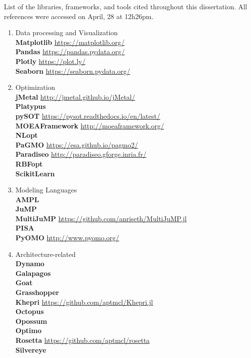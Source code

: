 List of the libraries, frameworks, and tools cited throughout this dissertation. All references were accessed on April, 28 at 12h26pm.
\begin{enumerate}[label=\Alph*]
\item Data processing and Visualization \\
\textbf{Matplotlib} \url{https://matplotlib.org/} \\
\textbf{Pandas} \url{https://pandas.pydata.org/} \\
\textbf{Plotly} \url{https://plot.ly/} \\
\textbf{Seaborn} \url{https://seaborn.pydata.org/}

\item Optimization \\
\textbf{jMetal} \url{http://jmetal.github.io/jMetal/} \\
\textbf{Platypus} \cite{platypus} \\
\textbf{pySOT} \url{https://pysot.readthedocs.io/en/latest/} \\
\textbf{MOEAFramework} \url{http://moeaframework.org/} \\
\textbf{NLopt} \cite{NLOPT} \\
\textbf{PaGMO} \url{https://esa.github.io/pagmo2/} \\
\textbf{Paradiseo} \url{http://paradiseo.gforge.inria.fr/} \\
\textbf{RBFopt} \cite{RBFOPT} \\ 
\textbf{ScikitLearn} \cite{scikit-learn} 

\item Modeling Languages  \\
\textbf{AMPL} \cite{AMPL} \\
\textbf{JuMP} \cite{DunningHuchetteLubin2017} \\
\textbf{MultiJuMP} \url{https://github.com/anriseth/MultiJuMP.jl} \\
\textbf{PISA} \cite{PISA2003} \\
\textbf{PyOMO} \url{http://www.pyomo.org/} \\

\item Architecture-related \\
\textbf{Dynamo} \cite{DYNAMOBIM} \\
\textbf{Galapagos} \cite{GALAPAGOS} \\
\textbf{Goat} \cite{GOAT} \\ 
\textbf{Grasshopper} \cite{GRASSHOPPER} \\ 
\textbf{Khepri} \url{https://github.com/aptmcl/Khepri.jl} \\
\textbf{Octopus} \cite{OCTOPUS} \\
\textbf{Opossum}  \cite{Wortmann2017Opossum} \\
\textbf{Optimo} \cite{OPTIMO} \\
\textbf{Rosetta} \url{https://github.com/aptmcl/rosetta} \\
\textbf{Silvereye} \cite{Cichocka2017SILVEREYE} \\


\end{enumerate}
